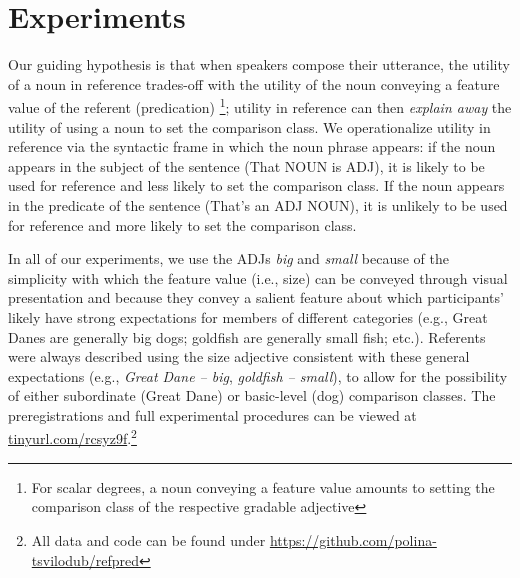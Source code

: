 \documentclass[10pt,letterpaper]{article}
\begin{document}
\section{Experiments}
Our guiding hypothesis is that when speakers compose their utterance, the utility of a noun in reference trades-off with the utility of the noun conveying a feature value of the referent (predication) \footnote{For scalar degrees, a noun conveying a feature value amounts to setting the comparison class of the respective gradable adjective}; utility in reference can then \emph{explain away} the utility of using a noun to set the comparison class. 
We operationalize utility in reference via the syntactic frame in which the noun phrase appears: if the noun appears in the subject of the sentence (That NOUN is ADJ), it is likely to be used for reference and less likely to set the comparison class. If the noun appears in the predicate of the sentence (That's an ADJ NOUN), it is unlikely to be used for reference and more likely to set the comparison class. 

In all of our experiments, we use the ADJs \emph{big} and \emph{small} because of the simplicity with which the feature value (i.e., size) can be conveyed through visual presentation and because they convey a salient feature about which participants' likely have strong expectations for members of different categories (e.g., Great Danes are generally big dogs; goldfish are generally small fish; etc.). 
Referents were always described using the size adjective consistent with these general expectations (e.g., \emph{Great Dane -- big}, \emph{goldfish -- small}), to allow for the possibility of either subordinate (Great Dane) or basic-level (dog) comparison classes.
The preregistrations and full experimental procedures can be viewed at \url{tinyurl.com/rcsyz9f}.\footnote{All data and code can be found under \url{https://github.com/polina-tsvilodub/refpred}}

\end{document}
